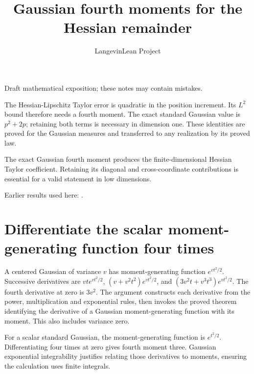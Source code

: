 \documentclass[11pt,a4paper]{article}
\title{\texorpdfstring{Gaussian fourth moments for the Hessian remainder}{Gaussian fourth moments for the Hessian remainder}}
\author{LangevinLean Project}
\date{}
\begin{document}
\maketitle
Draft mathematical exposition; these notes may contain mistakes.


The Hessian-Lipschitz Taylor error is quadratic in the position increment. Its \(L^{2}\) bound therefore needs a fourth moment. The exact standard Gaussian value is \(p^2+2p\); retaining both terms is necessary in dimension one. These identities are proved for the Gaussian measures and transferred to any realization by its proved law.



The exact Gaussian fourth moment produces the finite-dimensional Hessian Taylor coefficient. Retaining its diagonal and cross-coordinate contributions is essential for a valid statement in low dimensions.



Earlier results used here: \cite[Section~3.4]{LangevinLean2026ULASC}.

\section{\texorpdfstring{Differentiate the scalar moment-generating function four times}{Differentiate the scalar moment-generating function four times}}


A centered Gaussian of variance \(v\) has moment-generating function \(e^{vt^2/2}\). Successive derivatives are \(vt e^{vt^2/2}\), \((v+v^2t^2)e^{vt^2/2}\), and \((3v^2t+v^3t^3)e^{vt^2/2}\). The fourth derivative at zero is \(3v^2\). The argument constructs each derivative from the power, multiplication and exponential rules, then invokes the proved theorem identifying the derivative of a Gaussian moment-generating function with its moment. This also includes variance zero.



For a scalar standard Gaussian, the moment-generating function is \(e^{t^2/2}\). Differentiating four times at zero gives fourth moment three. Gaussian exponential integrability justifies relating those derivatives to moments, ensuring the calculation uses finite integrals.
\end{document}
